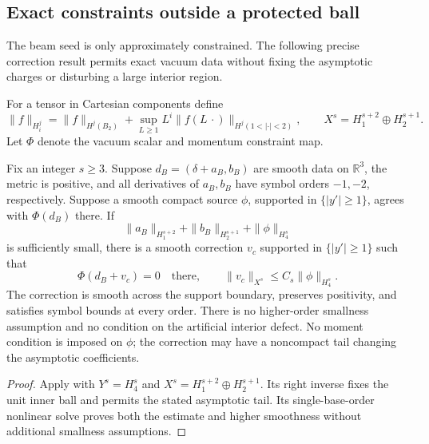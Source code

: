 \subsection{Exact constraints outside a protected ball}
\label{pk2:constraints}

The beam seed is only approximately constrained. The following
precise correction result permits exact vacuum data without fixing
the asymptotic charges or disturbing a large interior region.

For a tensor in Cartesian components define
\[
 \|f\|_{H_i^j}
 =\|f\|_{H^j(B_2)}
   +\sup_{L\ge1}L^i
       \|f(L\,\cdot)\|_{H^j(1<|\cdot|<2)},
 \qquad
 X^s=H_1^{s+2}\oplus H_2^{s+1}.
\]
Let $\Phi$ denote the vacuum scalar and momentum constraint map.

\begin{proposition}
\label{pk2:correction-theorem}
Fix an integer $s\ge3$. Suppose $d_B=(\delta+a_B,b_B)$ are smooth data on
$\mathbb R^3$, the metric is positive, and all derivatives of
$a_B,b_B$ have symbol orders $-1,-2$, respectively. Suppose a
smooth compact source $\phi$, supported in $\{|y'|\ge1\}$,
agrees with $\Phi(d_B)$ there. If
\[
 \|a_B\|_{H_1^{s+2}}+\|b_B\|_{H_2^{s+1}}
       +\|\phi\|_{H_4^s}
\]
is sufficiently small, there is a smooth correction $v_c$ supported
in $\{|y'|\ge1\}$ such that
\[
 \Phi(d_B+v_c)=0\quad\text{there},
 \qquad \|v_c\|_{X^s}\le C_s\|\phi\|_{H_4^s}.
\]
The correction is smooth across the support boundary, preserves
positivity, and satisfies symbol bounds at every order. There is
no higher-order smallness assumption and no condition on the
artificial interior defect. No moment condition is imposed on
$\phi$; the correction may have a noncompact tail changing the
asymptotic coefficients.
\end{proposition}
\begin{proof}
Apply  with $Y^s=H_4^s$ and
$X^s=H_1^{s+2}\oplus H_2^{s+1}$. Its right inverse fixes the
unit inner ball and permits the stated asymptotic tail. Its single-base-order
nonlinear solve proves both the estimate and higher smoothness without
additional smallness assumptions.
\end{proof}


